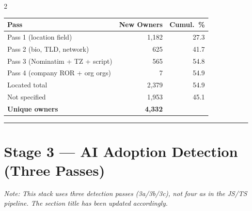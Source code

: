 \documentclass[10pt,a4paper]{article}
\begin{document}
\begin{multicols}{2}
\begin{tabular}{@{}lrr@{}}
\toprule
Pass & New Owners & Cumul.\ \% \\
\midrule
Pass 1 (location field)         & 1,182 & 27.3 \\
Pass 2 (bio, TLD, network)      &   625 & 41.7 \\
Pass 3 (Nominatim + TZ + script)&   565 & 54.8 \\
Pass 4 (company ROR + org orgs) &     7 & 54.9 \\
\midrule
Located total         & 2,379 & 54.9 \\
Not specified         & 1,953 & 45.1 \\
\textbf{Unique owners}& \textbf{4,332} & \\
\bottomrule
\end{tabular}

\end{multicols}

\vspace{6pt}
\hrule
\vspace{6pt}

\section*{Stage 3 --- AI Adoption Detection (Three Passes)}

\textit{Note: This stack uses three detection passes (3a/3b/3c), not four as in the JS/TS pipeline.
The section title has been updated accordingly.}
\end{document}
